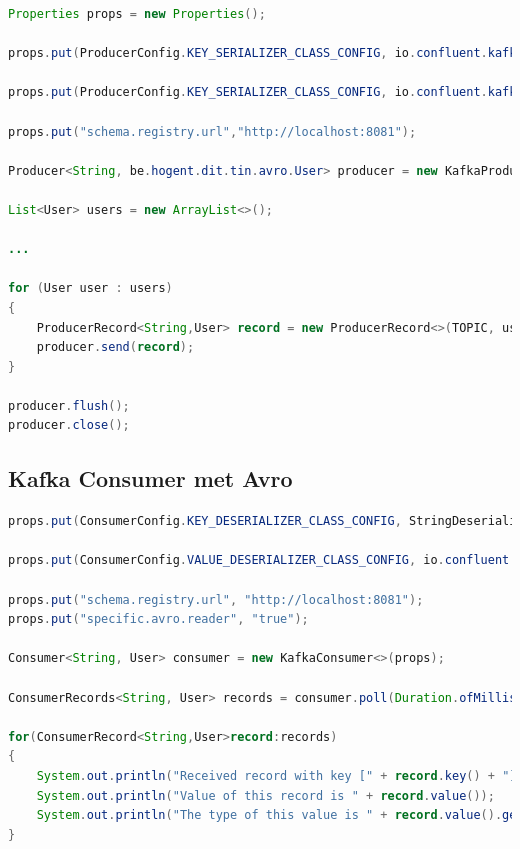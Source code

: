 \documentclass[a4paper,10pt,twoside]{report}
\begin{document}
\newpage

\begin{lstlisting}[language=Java]
Properties props = new Properties();

props.put(ProducerConfig.KEY_SERIALIZER_CLASS_CONFIG, io.confluent.kafka.serializers.KafkaAvroSerializer.class.getName());

props.put(ProducerConfig.KEY_SERIALIZER_CLASS_CONFIG, io.confluent.kafka.serializers.KafkaAvroSerializer.class.getName());

props.put("schema.registry.url","http://localhost:8081");

Producer<String, be.hogent.dit.tin.avro.User> producer = new KafkaProducer<>(props);

List<User> users = new ArrayList<>();

...

for (User user : users)
{
	ProducerRecord<String,User> record = new ProducerRecord<>(TOPIC, user.getName().toString(), user);
	producer.send(record);
}

producer.flush();
producer.close();
\end{lstlisting}

\subsection{Kafka Consumer met Avro}

\begin{lstlisting}[language=Java]
props.put(ConsumerConfig.KEY_DESERIALIZER_CLASS_CONFIG, StringDeserializer.class.getName());

props.put(ConsumerConfig.VALUE_DESERIALIZER_CLASS_CONFIG, io.confluent.kafka.serializers.KafkaAvroDeserializer.class.getName());

props.put("schema.registry.url", "http://localhost:8081");
props.put("specific.avro.reader", "true");

Consumer<String, User> consumer = new KafkaConsumer<>(props);

ConsumerRecords<String, User> records = consumer.poll(Duration.ofMillis(500));

for(ConsumerRecord<String,User>record:records)
{
	System.out.println("Received record with key [" + record.key() + "]");
	System.out.println("Value of this record is " + record.value());
	System.out.println("The type of this value is " + record.value().getClass().getName());
}
\end{lstlisting}
\end{document}

